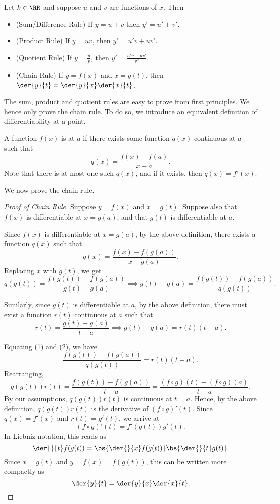 \begin{proposition}
    Let $k \in \RR$ and suppose $u$ and $v$ are functions of $x$. Then
    \begin{itemize}
        \item (Sum/Difference Rule) If $y = u \pm v$ then $y' = u' \pm v'$.
        \item (Product Rule) If $y = uv$, then $y' = u' v + u v'$.
        \item (Quotient Rule) If $y = \frac{u}{v}$, then $y' = \frac{u' v - u v'}{v^2}$.
        \item (Chain Rule) If $y = f(x)$ and $x = g(t)$, then $\der{y}{t} = \der{y}{x} \der{x}{t}$.
    \end{itemize}
\end{proposition}
The sum, product and quotient rules are easy to prove from first principles. We hence only prove the chain rule. To do so, we introduce an equivalent definition of differentiability at a point.
\begin{definition}\label{def:Differentiability}
    A function $f(x)$ is  at $a$ if there exists some function $q(x)$ continuous at $a$ such that \[q(x) = \frac{f(x) - f(a)}{x - a}.\] Note that there is at most one such $q(x)$, and if it exists, then $q(x) = f'(x)$.
\end{definition}
We now prove the chain rule.
\begin{proof}[Proof of Chain Rule]    
    Suppose $y = f(x)$ and $x = g(t)$. Suppose also that $f(x)$ is differentiable at $x = g(a)$, and that $g(t)$ is differentiable at $a$.

    Since $f(x)$ is differentiable at $x = g(a)$, by the above definition, there exists a function $q(x)$ such that \[q(x) = \frac{f(x) - f(g(a))}{x - g(a)}.\] Replacing $x$ with $g(t)$, we get \[q(g(t)) = \frac{f(g(t)) - f(g(a))}{g(t) - g(a)} \implies g(t) - g(a) = \frac{f(g(t)) - f(g(a))}{q(g(t))}. \tag{1}\]

    Similarly, since $g(t)$ is differentiable at $a$, by the above definition, there must exist a function $r(t)$ continuous at $a$ such that \[r(t) = \frac{g(t) - g(a)}{t - a} \implies g(t) - g(a) = r(t) (t - a). \tag{2}\]

    Equating (1) and (2), we have \[\frac{f(g(t)) - f(g(a))}{q(g(t))} = r(t) (t - a).\] Rearranging, \[q(g(t)) r(t) = \frac{f(g(t)) - f(g(a))}{t - a} = \frac{(f \circ g)(t) - (f \circ g)(a)}{t - a}.\] By our assumptions, $q(g(t)) r(t)$ is continuous at $t = a$. Hence, by the above definition, $q(g(t)) r(t)$ is the derivative of $(f \circ g)'(t)$. Since $q(x) = f'(x)$ and $r(t) = g'(t)$, we arrive at \[(f \circ g)'(t) = f'(g(t)) g'(t).\] In Liebniz notation, this reads as \[\der{}{t} f(g(t)) = \bs{\der{}{x} f(g(t))} \bs{\der{}{t} g(t)}.\] Since $x = g(t)$ and $y = f(x) = f(g(t))$, this can be written more compactly as \[\der{y}{t} = \der{y}{x} \der{x}{t}.\]
\end{proof}

